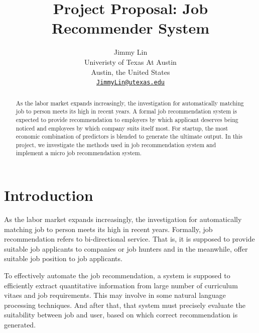\documentclass[10pt,twocolumn,letterpaper]{article}
\begin{document}
\title{Project Proposal: Job Recommender System}

\author{Jimmy Lin\\
Univeristy of Texas At Austin\\
Austin, the United States\\
{\tt\small \url{JimmyLin@utexas.edu}}
}

\maketitle

\begin{abstract}
    As the labor market expands increasingly, the investigation for
    automatically matching job to person meets its high in recent years.
    A formal job recommendation system is expected to provide recommendation
    to employers by which applicant deserves being noticed and employees by
    which company suits itself most. For startup, the most economic
    combination of predictors is blended to generate the ultimate output. In this
    project, we investigate the methods used in job recommendation system and
    implement a micro job recommendation system. 
\end{abstract}

\section{Introduction}

As the labor market expands increasingly, the investigation for automatically
matching job to person meets its high in recent years. Formally, job
recommendation refers to bi-directional service. That is, it is supposed to
provide suitable job applicants to companies or job hunters and in the
meanwhile, offer suitable job position to job applicants. 

To effectively automate the job recommendation, a system is supposed to
efficiently extract quantitative information from large number of curriculum
vitaes and job requirements. This may involve in some natural language
processing techniques. And after that, that system must precisely evaluate
the suitability between job and user, based on which correct recommendation is
generated. 
\end{document}
